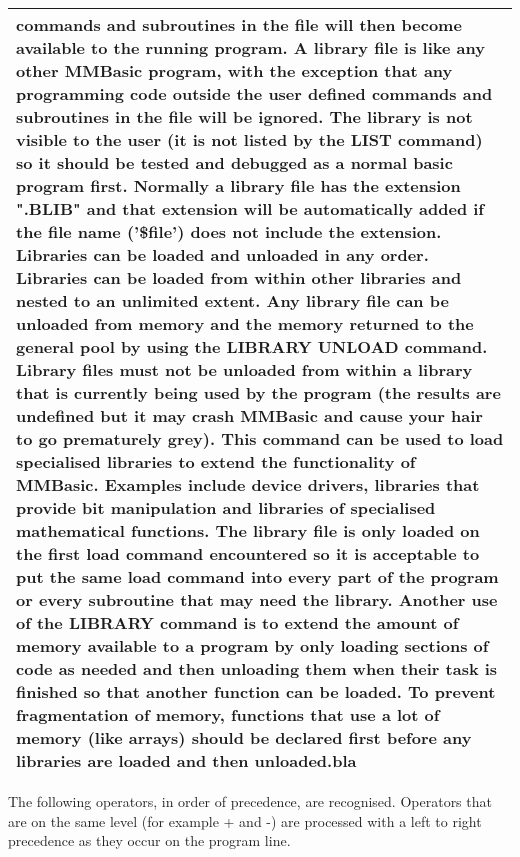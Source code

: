 \documentclass[11pt,fleqn]{book} %
\numberwithin{equation}{section} %
\numberwithin{figure}{section} %
\numberwithin{table}{section} %
\begin{document}
\begin{center}
\begin{longtable}{l}
commands and subroutines in the file will then become available to the
running program.\newline 
A library file is like any other MMBasic program, with the exception
that any programming code outside the user defined commands and
subroutines in the file will be ignored. The library is not visible to the
user (it is not listed by the LIST command) so it should be tested and
debugged as a normal basic program first. Normally a library file has
the extension ".BLIB" and that extension will be automatically added if
the file name ('\$file') does not include the extension.\newline
Libraries can be loaded and unloaded in any order. Libraries can be
loaded from within other libraries and nested to an unlimited extent.
Any library file can be unloaded from memory and the memory returned
to the general pool by using the LIBRARY UNLOAD command.\newline
Library files must not be unloaded from within a library that is currently
being used by the program (the results are undefined but it may crash
MMBasic and cause your hair to go prematurely grey).\newline
This command can be used to load specialised libraries to extend the
functionality of MMBasic. Examples include device drivers, libraries
that provide bit manipulation and libraries of specialised mathematical
functions. The library file is only loaded on the first load command
encountered so it is acceptable to put the same load command into every
part of the program or every subroutine that may need the library.\newline
Another use of the LIBRARY command is to extend the amount of
memory available to a program by only loading sections of code as
needed and then unloading them when their task is finished so that
another function can be loaded.\newline
To prevent fragmentation of memory, functions that use a lot of memory
(like arrays) should be declared first before any
libraries are loaded and then unloaded.bla
\\ \hline 
\end{longtable}
\end{center}









The following operators, in order of precedence, are recognised. Operators that are on the same level (for
example + and -) are processed with a left to right precedence as they occur on the program line.

\end{document}
